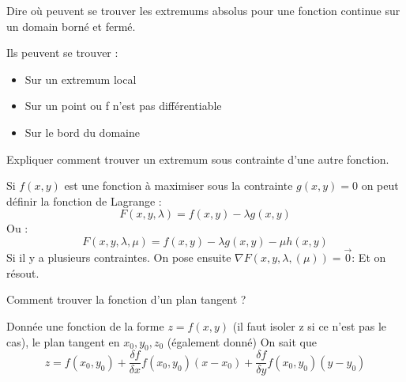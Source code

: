 \documentclass[12pt]{article}
\newcommand*{\xfield}[1]{\begin{mdframed}\centering #1\end{mdframed}\bigskip}
\newenvironment{note}{}{}
\begin{document}
\begin{note}
\xfield{Dire où peuvent se trouver les extremums absolus pour une fonction continue sur un domain borné et fermé.}
\xfield{Ils peuvent se trouver :
\begin{itemize}
\item Sur un extremum local
\item Sur un point ou f n'est pas différentiable
\item Sur le bord du domaine 
\end{itemize}}
\end{note}

\begin{note}
\xfield{Expliquer comment trouver un extremum sous contrainte d'une autre fonction.}
\xfield{Si $f(x,y)$ est une fonction à maximiser sous la contrainte $g(x,y) = 0$ on peut définir la fonction de Lagrange :
$$F(x,y,\lambda) = f(x,y) - \lambda g(x,y)$$
Ou :
$$F(x,y,\lambda, \mu) = f(x,y) - \lambda g(x,y) - \mu h(x,y)$$
Si il y a plusieurs contraintes.
On pose ensuite $\nabla F(x,y,\lambda, (\mu)) = \vec{0}$: Et on résout.}
\end{note}

\begin{note}
\xfield{Comment trouver la fonction d'un plan tangent ?}
\xfield{Donnée une fonction de la forme $z=f(x,y)$ (il faut isoler z si ce n'est pas le cas), le plan tangent en $x_0,y_0,z_0$ (également donné) On sait que
$$ z = f(x_0,y_0) + \frac{\delta f}{\delta x}f(x_0,y_0)(x-x_0) + \frac{\delta f}{\delta y}f(x_0,y_0)(y-y_0) $$}
\end{note}
\end{document}
